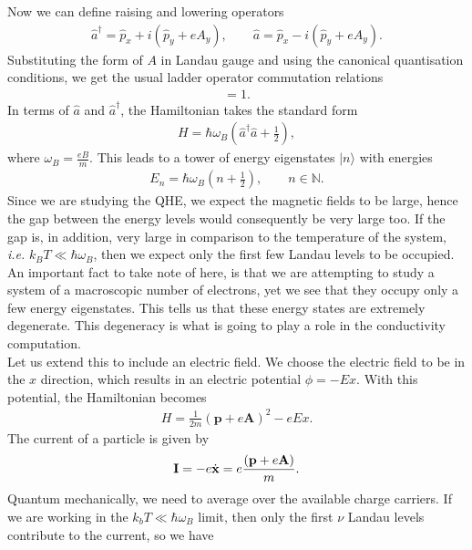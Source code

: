  Now we can define raising and lowering operators 
\begin{align}
    \hat{a}^{\dagger}= \hat{p}_x +i (\hat{p}_y +e A_y), \qquad \hat{a}= \hat{p}_x  -i (\hat{p}_y +e A_y).
\end{align}
 Substituting the form of $A$ in Landau gauge and using the canonical quantisation conditions, we get the usual ladder operator commutation relations
\begin{align}
     [\hat{a}, \hat{a}^{\dagger}] =1.
\end{align}
In terms of $\hat{a}$ and $\hat{a}^{\dagger}$, the Hamiltonian takes the standard form
\begin{align}
     H = \hbar \omega_B \left( \hat{a}^{\dagger} \hat{a}+ \frac{1}{2}\right),
\end{align}
 where $\omega_B=\frac{eB}{m}$. This leads to a tower of energy eigenstates $|n\rangle$ with energies
\begin{align}
     E_n= \hbar \omega_B \left( n + \frac{1}{2} \right), \qquad n \in \mathbb{N}.
\end{align}
  Since we are studying the QHE, we expect the magnetic fields to be large, hence the gap between the energy levels would consequently be very large too. If the gap is, in addition, very large in comparison to the temperature of the system, \textit{i.e.} $k_B T \ll \hbar \omega_B$, then we expect only the first few Landau levels to be occupied. An important fact to take note of here, is that we are attempting to study a system of a macroscopic number of electrons, yet we see that they occupy only a few energy eigenstates. This tells us that these energy states are extremely degenerate. This degeneracy is what is going to play a role in the conductivity computation.\\
 \indent  Let us extend this to include an electric field. We choose the electric field to be in the $x$ direction, which results in an electric potential $\phi = -Ex$. With this potential, the Hamiltonian becomes
\begin{align}
     H=\frac{1}{2m}\left(\bm{p} +e \bm{A} \right)^2 -e Ex.
\end{align}
  The current of a particle is given by
\begin{align}
     {\bf{I}}=-e\dot{{\bf x}}=  e \frac{\left({\bf p}+e{\bf A}\right)}{m}.
\end{align}
  Quantum mechanically, we need to average over the available charge carriers. If we are working in the $k_b T \ll \hbar \omega_B$ limit, then only the first $\nu$ Landau levels contribute to the current, so we have
